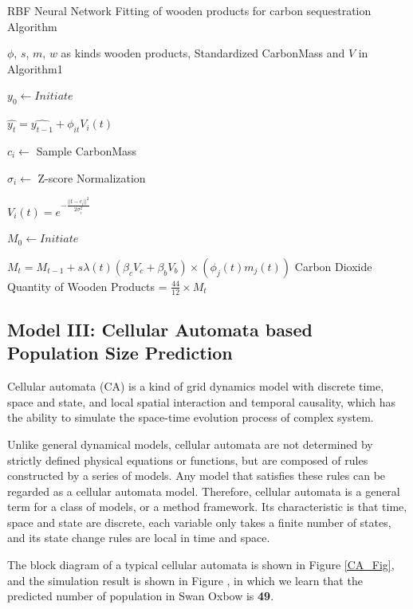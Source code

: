 \documentclass{mcmthesis}
\numberwithin{figure}{section}
\numberwithin{table}{section}
\numberwithin{equation}{section}
\begin{document}
  \begin{algorithm}[htbp]
    \caption{RBF Neural Network Fitting of wooden products for carbon sequestration Algorithm} \label{Product Algo}
    \begin{algorithmic}[1]
        \Require
            $ \phi $, $ s $, $ m $, $ w $ as kinds wooden products, Standardized CarbonMass and $ V $ in Algorithm1 

                $ y_0 \gets Initiate $ 

                $ \hat{y_t} = \hat{y_{t-1}} + \phi_{it}V_i(t) $
            
                $ c_i\gets $ Sample CarbonMass
            
                $ \sigma_i\gets $ Z-score Normalization

                $ V_i(t) = e^{-\frac{||t-c_i||^2}{2\sigma_i^2}} $
            \EndFor

            $ M_0\gets Initiate $ 


            $ M_t = M_{t-1}+s\lambda(t)(\beta_cV_c+\beta_bV_b)\times (\phi_j(t)m_j(t)) $ 
            \EndFor
        \EndFor
        \Ensure
        Carbon Dioxide Quantity of Wooden Products = $ \frac{44}{12} \times M_t$ 
    \end{algorithmic}
\end{algorithm}


\subsection{Model III: Cellular Automata based Population Size Prediction}

Cellular automata (CA) is a kind of grid dynamics model with discrete time, 
space and state, and local spatial interaction and temporal causality, which 
has the ability to simulate the space-time evolution process of complex system.
\par
Unlike general dynamical models, cellular automata are not determined by strictly 
defined physical equations or functions, but are composed of rules constructed by 
a series of models. Any model that satisfies these rules can be regarded as a cellular 
automata model. Therefore, cellular automata is a general term for a class of models, 
or a method framework. Its characteristic is that time, space and state are discrete, 
each variable only takes a finite number of states, and its state change rules are local 
in time and space.
\par
The block diagram of a typical cellular automata is shown in Figure \ref{CA_Fig}, 
and the simulation result is shown in Figure , in which we learn 
that the predicted number of population in Swan Oxbow is \textbf{49}.
\end{document}
